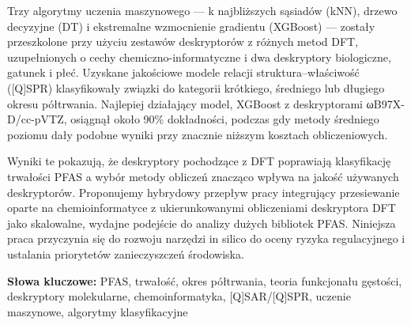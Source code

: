 Trzy algorytmy uczenia maszynowego — k najbliższych sąsiadów (kNN), drzewo decyzyjne (DT) i ekstremalne wzmocnienie gradientu (XGBoost) — zostały przeszkolone przy użyciu zestawów deskryptorów z różnych
metod DFT, uzupełnionych o cechy chemiczno-informatyczne i dwa deskryptory biologiczne,
gatunek i płeć. Uzyskane jakościowe modele relacji struktura–właściwość ([Q]SPR)
klasyfikowały związki do kategorii krótkiego, średniego lub długiego okresu półtrwania. Najlepiej działający
model, XGBoost z deskryptorami ωB97X-D/cc-pVTZ, osiągnął około 90\% dokładności, podczas gdy metody średniego poziomu dały podobne wyniki przy znacznie niższym
kosztach obliczeniowych.

Wyniki te pokazują, że deskryptory pochodzące z DFT poprawiają klasyfikację trwałości PFAS
a wybór metody obliczeń znacząco wpływa na jakość używanych deskryptorów. Proponujemy hybrydowy przepływ pracy integrujący przesiewanie oparte na chemioinformatyce z ukierunkowanymi obliczeniami deskryptora DFT
jako skalowalne, wydajne podejście do analizy dużych bibliotek PFAS. Niniejsza praca przyczynia się do
rozwoju narzędzi in silico do oceny ryzyka regulacyjnego i ustalania priorytetów zanieczyszczeń środowiska.

\vspace{0.1cm}

\textbf{Słowa kluczowe:} PFAS, trwałość, okres półtrwania, teoria funkcjonału gęstości, deskryptory molekularne, chemoinformatyka, [Q]SAR/[Q]SPR, uczenie maszynowe, algorytmy klasyfikacyjne
